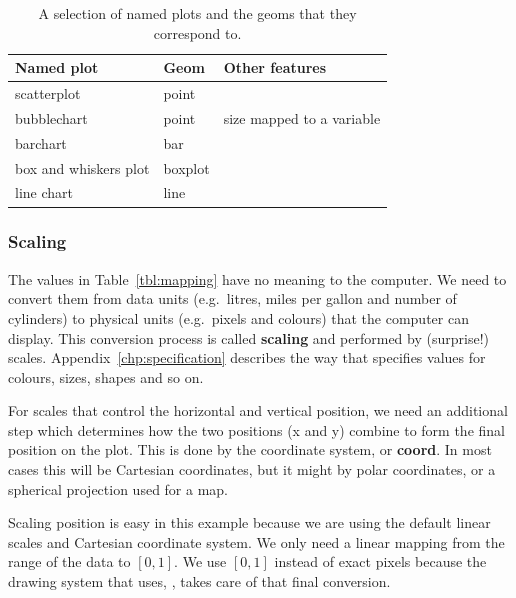 \begin{table}
  \begin{center}
  \begin{tabular}{lll}
    \toprule 
    Named plot & Geom & Other features \\
    \midrule
    scatterplot & point &  \\
    bubblechart & point & size mapped to a variable \\ 
    barchart & bar &  \\
    box and whiskers plot & boxplot &  \\
    line chart & line &  \\     
    \bottomrule
  \end{tabular}
  \end{center}
  \caption{A selection of named plots and the geoms that they correspond to.}
  \label{tbl:named-plots}
\end{table}

% 


\subsubsection{Scaling} 

The values in Table~\ref{tbl:mapping} have no meaning to the computer.  We need to convert them from data units (e.g.\ litres, miles per gallon and number of cylinders) to physical units (e.g.\ pixels and colours) that the computer can display.  This conversion process is called {\bf scaling} and performed by (surprise!) scales.   Appendix~\ref{chp:specification} describes the way that specifies values for colours, sizes, shapes and so on.

For scales that control the horizontal and vertical position, we need an additional step which determines how the two positions (x and y) combine to form the final position on the plot.  This is done by the coordinate system, or {\bf coord}.  In most cases this will be Cartesian coordinates, but it might by polar coordinates, or a spherical projection used for a map.

Scaling position is easy in this example because we are using the default  linear scales and Cartesian coordinate system.  We only need a linear mapping from the range of the data to $[0, 1]$.  We use $[0, 1]$ instead of exact pixels because the drawing system that \ggplot uses, , takes care of that final conversion. 

